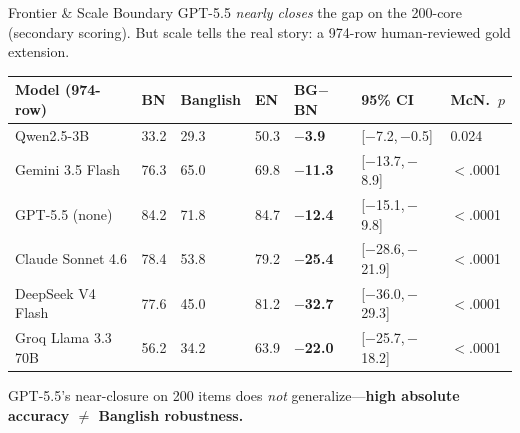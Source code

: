 \documentclass[aspectratio=169,10pt]{beamer}
\newcommand{\gp}[1]{\textbf{\color{bad}#1}}     %
\begin{document}
\begin{frame}{Frontier \& Scale Boundary}
\footnotesize
GPT-5.5 \emph{nearly closes} the gap on the 200-core (secondary scoring). But scale tells the real story: a 974-row human-reviewed gold extension.
\vspace{0.12cm}

\centering
\renewcommand{\arraystretch}{1.05}
\begin{tabular}{L{2.9cm} C{1.0cm} C{1.4cm} C{1.0cm} C{1.4cm} C{2.0cm} C{1.3cm}}
\toprule
\textbf{Model (974-row)} & \textbf{\color{cBangla}BN} & \textbf{\color{cBanglish}Banglish} & \textbf{\color{cEnglish}EN} & \textbf{BG$-$BN} & \textbf{95\% CI} & \textbf{McN.\ $p$}\\
\midrule
Qwen2.5-3B       & 33.2 & 29.3 & 50.3 & \gp{$-$3.9}  & [$-$7.2,\,$-$0.5] & 0.024\\
Gemini 3.5 Flash & 76.3 & 65.0 & 69.8 & \gp{$-$11.3} & [$-$13.7,\,$-$8.9] & $<$.0001\\
GPT-5.5 (none)   & 84.2 & 71.8 & 84.7 & \gp{$-$12.4} & [$-$15.1,\,$-$9.8] & $<$.0001\\
Claude Sonnet 4.6 & 78.4 & 53.8 & 79.2 & \gp{$-$25.4} & [$-$28.6,\,$-$21.9] & $<$.0001\\
DeepSeek V4 Flash & 77.6 & 45.0 & 81.2 & \gp{$-$32.7} & [$-$36.0,\,$-$29.3] & $<$.0001\\
Groq Llama 3.3 70B & 56.2 & 34.2 & 63.9 & \gp{$-$22.0} & [$-$25.7,\,$-$18.2] & $<$.0001\\
\bottomrule
\end{tabular}
\vspace{0.18cm}

\noindent
{}\hfill
{}\hfill
{}\hfill
{}
\vspace{0.08cm}

{\centering\footnotesize\color{subink} GPT-5.5's near-closure on 200 items does \emph{not} generalize—\textbf{high absolute accuracy $\neq$ Banglish robustness.}\par}
\end{frame}

\end{document}
